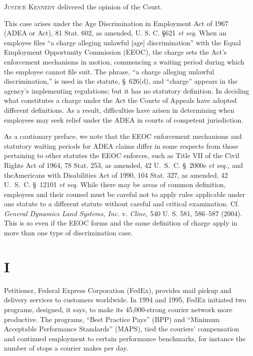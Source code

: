 
\setcounter{page}{392}

  \textsc{Justice Kennedy} delivered the opinion of the Court.

  This case arises under the Age Discrimination in Employment Act
of 1967 (ADEA or Act), 81 Stat. 602, as amended,  U. S.
C. \S621 \emph{et seq.} When an employee files ``a charge alleging
unlawful [age] discrimination'' with the Equal Employment Opportunity
Commission (EEOC), the charge sets the Act's enforcement mechanisms
in motion, commencing a waiting period during which the employee cannot
file suit. The phrase, ``a charge alleging unlawful discrimination,''
is used in the statute, \S~626(d), and ``charge'' appears in the
agency's implementing regulations; but it has no statutory definition.
In deciding what constitutes a charge under the Act the Courts of
Appeals have adopted different definitions. As a result, difficulties
have arisen in determining when employees may seek relief under the ADEA
in courts of competent jurisdiction.

  As a cautionary preface, we note that the EEOC enforcement mechanisms
and statutory waiting periods for ADEA claims differ in some respects
from those pertaining to other statutes the EEOC enforces, such as Title
VII of the Civil Rights Act of 1964, 78 Stat. 253, as amended, 42
U.~S.~C. \S~2000e \emph{et seq.,} and theAmericans with Disabilities
Act of 1990, 104 Stat. 327, as amended, 42 U.~S.~C. \S~12101 \emph{et
seq.} While there may be areas of common definition, employees and
their counsel must be careful not to apply rules applicable under one
statute to a different statute without careful and critical examination.
Cf. \emph{General Dynamics Land Systems, Inc.} v. \emph{Cline,} 540 U. S.
581, 586--587 (2004). This is so even if the EEOC forms and the same
definition of charge apply in more than one type of discrimination case.

\section{I}

  Petitioner, Federal Express Corporation (FedEx), provides mail pickup
and delivery services to customers worldwide. In 1994 and 1995, FedEx
initiated two programs, designed, it says, to make its 45,000-strong
courier network more productive. The programs, ``Best Practice Pays''
(BPP) and ``Minimum Acceptable Performance Standards'' \newpage  (MAPS),
tied the couriers' compensation and continued employment to certain
performance benchmarks, for instance the number of stops a courier makes
per day.


